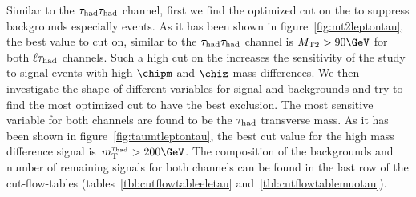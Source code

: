 Similar to the $\tau_{\rm had}\tau_{\rm had}$ channel, first we find the optimized cut on the \mttwo to suppress backgrounds especially \wjets events. As it has been shown in figure~\ref{fig:mt2leptontau}, the best value to cut on, similar to the $\tau_{\rm had}\tau_{\rm had}$ channel is $\mttwo > 90 \GeV$ for both $\ell\tau_{\rm had}$ channels. Such a high cut on the \mttwo increases the sensitivity of the study to signal events with high $\chipm$ and $\chiz$ mass differences. We then investigate the shape of different variables for signal and backgrounds and try to find the most optimized cut to have the best exclusion. The most sensitive variable for both channels are found to be the $\tau_{\rm had}$ transverse mass. As it has been shown in figure~\ref{fig:taumtleptontau}, the best cut value for the high mass difference signal is $\tauMT > 200 \GeV$. The composition of the backgrounds and number of remaining signals for both channels can be found in the last row of the cut-flow-tables (tables~\ref{tbl:cutflowtableeletau} and~\ref{tbl:cutflowtablemuotau}).

